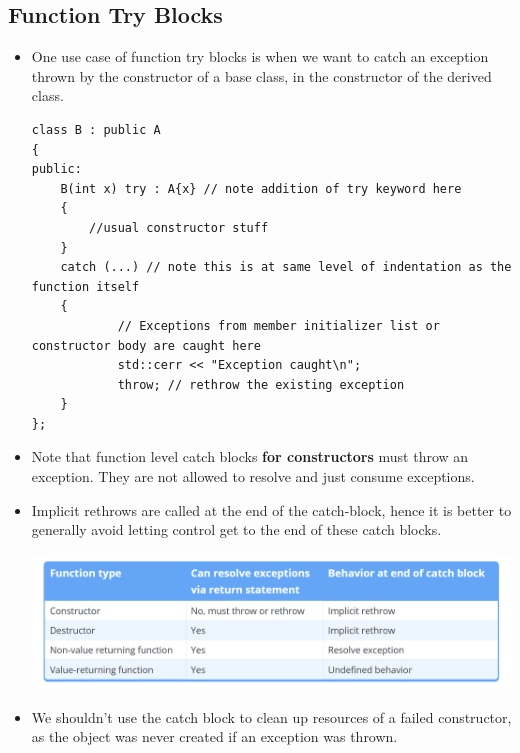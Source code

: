 \documentclass{report}
\begin{document}
\subsection{Function Try Blocks}
\begin{itemize}
\item One use case of function try blocks is when we want to catch
an exception thrown by the constructor of a base class, in the constructor of the 
derived class.
\begin{lstlisting}
class B : public A
{
public:
    B(int x) try : A{x} // note addition of try keyword here
    {
        //usual constructor stuff
    }
    catch (...) // note this is at same level of indentation as the function itself
    {
            // Exceptions from member initializer list or constructor body are caught here
            std::cerr << "Exception caught\n";
            throw; // rethrow the existing exception
    }
};
\end{lstlisting}
\item Note that function level catch blocks \textbf{for constructors} must throw an exception.
They are not allowed to resolve and just consume exceptions.
\item Implicit rethrows are called at the end of the catch-block, hence it is better to generally avoid
letting control get to the end of these catch blocks.
\begin{center}
\includegraphics[width=13cm]{rsrc/functiontrycatch.png}
\end{center}
\item We shouldn't use the catch block to clean up resources of a failed constructor, as the object was never created if an exception was thrown.
\end{itemize}
\end{document}
